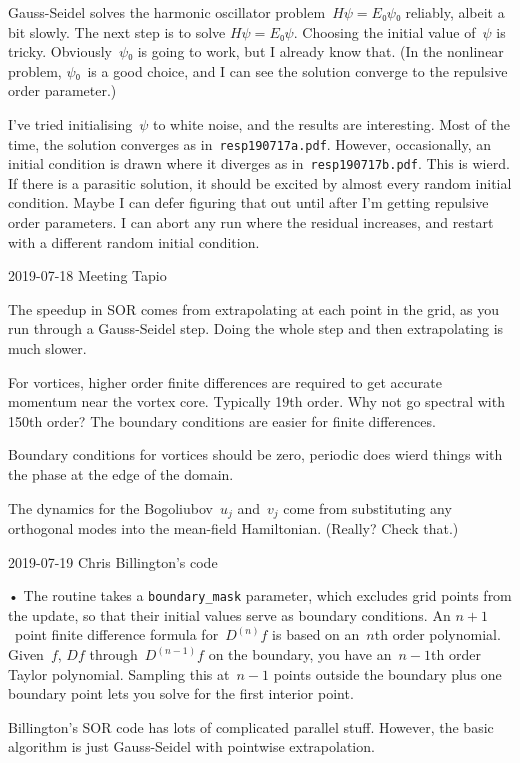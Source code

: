 Gauss-Seidel solves the harmonic oscillator problem~$Hψ=E₀ψ₀$ reliably, albeit a bit slowly.  The next step is to solve $Hψ=E₀ψ$.  Choosing the initial value of~$ψ$ is tricky.  Obviously~$ψ₀$ is going to work, but I already know that.  (In the nonlinear problem, $ψ₀$~is a good choice, and I can see the solution converge to the repulsive order parameter.)

I've tried initialising~$ψ$ to white noise, and the results are interesting.  Most of the time, the solution converges as in~{\tt resp190717a.pdf}.  However, occasionally, an initial condition is drawn where it diverges as in~{\tt resp190717b.pdf}.  This is wierd.  If there is a parasitic solution, it should be excited by almost every random initial condition.  Maybe I can defer figuring that out until after I'm getting repulsive order parameters.  I can abort any run where the residual increases, and restart with a different random initial condition.

2019-07-18 Meeting Tapio

The speedup in SOR comes from extrapolating at each point in the grid, as you run through a Gauss-Seidel step.  Doing the whole step and then extrapolating is much slower.

For vortices, higher order finite differences are required to get accurate momentum near the vortex core.  Typically 19th order.  Why not go spectral with 150th order?  The boundary conditions are easier for finite differences.

Boundary conditions for vortices should be zero, periodic does wierd things with the phase at the edge of the domain.

The dynamics for the Bogoliubov~$u_j$ and~$v_j$ come from substituting any orthogonal modes into the mean-field Hamiltonian.  (Really?  Check that.) 

2019-07-19 Chris Billington's code

\item• The routine takes a {\tt boundary_mask} parameter, which excludes grid points from the update, so that their initial values serve as boundary conditions.  An $n+1$~point finite difference formula for~$D^{(n)}f$ is based on an~$n$th order polynomial.  Given~$f$, $Df$ through~$D^{(n-1)}f$ on the boundary, you have an~$n-1$th order Taylor polynomial.  Sampling this at~$n-1$ points outside the boundary plus one boundary point lets you solve for the first interior point.

Billington's SOR code has lots of complicated parallel stuff.  However, the basic algorithm is just Gauss-Seidel with pointwise extrapolation.

\bye